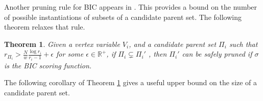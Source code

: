 \documentclass[letterpaper]{article}
\newcommand{\vertex}[1]{V_{#1}}
\newcommand{\parents}{\Pi}
\newtheorem{theorem}{Theorem}
\newtheorem{corollary}{Corollary}
\begin{document}
Another pruning rule for BIC appears in \cite{CamposJ11}. This provides a bound on the number of possible instantiations of subsets of a candidate parent set. The following theorem relaxes that rule.




\begin{theorem}
	Given a vertex variable $V_i$, and a candidate parent set $\Pi_i$ such that $r_{\Pi_i}> \frac{N}{w} \frac{\log r_i}{r_i -1} + \epsilon$ for some $\epsilon \in \mathbb{R}^+$,  if $\parents_i \subsetneq \parents_i'$ , then $\parents_i'$ can be safely pruned if $\sigma$ is the BIC scoring function. \label{THEOREM:decamposbicrelaxed}
\end{theorem}

The following corollary of Theorem \ref{THEOREM:decamposbicrelaxed} gives a useful upper bound on the size of a candidate parent set.

\end{document}
